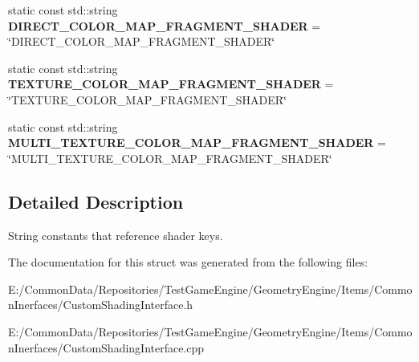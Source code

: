 \begin{DoxyCompactItemize}
\item 
\mbox{\label{struct_geometry_engine_1_1_custom_shading_1_1_custom_shading_constants_a2c87b9dba74a8477efbd17f08617cf46}} 
static const std\+::string {\bfseries D\+I\+R\+E\+C\+T\+\_\+\+C\+O\+L\+O\+R\+\_\+\+M\+A\+P\+\_\+\+F\+R\+A\+G\+M\+E\+N\+T\+\_\+\+S\+H\+A\+D\+ER} = \char`\"{}D\+I\+R\+E\+C\+T\+\_\+\+C\+O\+L\+O\+R\+\_\+\+M\+A\+P\+\_\+\+F\+R\+A\+G\+M\+E\+N\+T\+\_\+\+S\+H\+A\+D\+ER\char`\"{}
\item 
\mbox{\label{struct_geometry_engine_1_1_custom_shading_1_1_custom_shading_constants_ab7f7740a8eea3c6296e5c11d0b79d729}} 
static const std\+::string {\bfseries T\+E\+X\+T\+U\+R\+E\+\_\+\+C\+O\+L\+O\+R\+\_\+\+M\+A\+P\+\_\+\+F\+R\+A\+G\+M\+E\+N\+T\+\_\+\+S\+H\+A\+D\+ER} = \char`\"{}T\+E\+X\+T\+U\+R\+E\+\_\+\+C\+O\+L\+O\+R\+\_\+\+M\+A\+P\+\_\+\+F\+R\+A\+G\+M\+E\+N\+T\+\_\+\+S\+H\+A\+D\+ER\char`\"{}
\item 
\mbox{\label{struct_geometry_engine_1_1_custom_shading_1_1_custom_shading_constants_acc77a797916e89fff2675c27fa464ec9}} 
static const std\+::string {\bfseries M\+U\+L\+T\+I\+\_\+\+T\+E\+X\+T\+U\+R\+E\+\_\+\+C\+O\+L\+O\+R\+\_\+\+M\+A\+P\+\_\+\+F\+R\+A\+G\+M\+E\+N\+T\+\_\+\+S\+H\+A\+D\+ER} = \char`\"{}M\+U\+L\+T\+I\+\_\+\+T\+E\+X\+T\+U\+R\+E\+\_\+\+C\+O\+L\+O\+R\+\_\+\+M\+A\+P\+\_\+\+F\+R\+A\+G\+M\+E\+N\+T\+\_\+\+S\+H\+A\+D\+ER\char`\"{}
\end{DoxyCompactItemize}


\subsection{Detailed Description}
String constants that reference shader keys. 

The documentation for this struct was generated from the following files\+:\begin{DoxyCompactItemize}
\item 
E\+:/\+Common\+Data/\+Repositories/\+Test\+Game\+Engine/\+Geometry\+Engine/\+Items/\+Common\+Inerfaces/Custom\+Shading\+Interface.\+h\item 
E\+:/\+Common\+Data/\+Repositories/\+Test\+Game\+Engine/\+Geometry\+Engine/\+Items/\+Common\+Inerfaces/Custom\+Shading\+Interface.\+cpp\end{DoxyCompactItemize}
